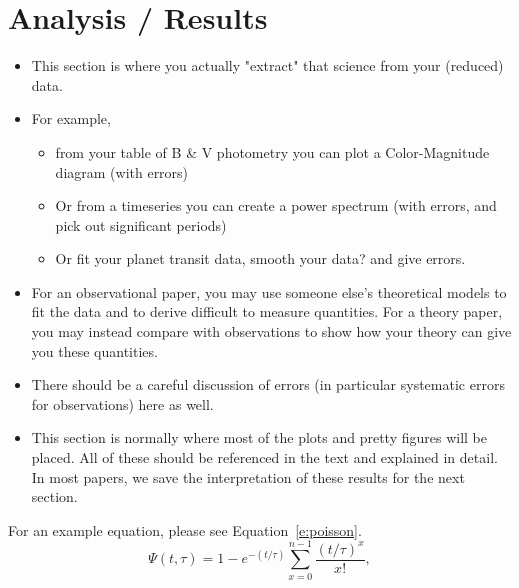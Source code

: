 \documentclass[twocolumn]{aastex61}
\begin{document}
\section{Analysis / Results}
\begin{itemize}\itemsep0em
\item This section is where you actually "extract" that science from your (reduced) data.
\item For example, 
\begin{itemize}\itemsep0em
\item from your table of B \& V photometry you can plot a Color-Magnitude diagram (with errors)
\item Or from a timeseries you can create a power spectrum (with errors, and pick out significant periods)
\item Or fit your planet transit data, smooth your data? and give errors.
\end{itemize}
\item For an observational paper, you may use someone else's theoretical models to fit the data and to derive difficult to measure quantities.  For a theory paper, you may instead compare with observations to show how your theory can give you these quantities. 
\item There should be a careful discussion of errors (in particular systematic errors for observations) here as well.
\item This section is normally where most of the plots and pretty figures will be placed.  All of these should be referenced in the text and explained in detail.  In most papers, we save the interpretation of these results for the next section.
\end{itemize}

For an example equation, please see Equation~\ref{e:poisson}.
\begin{equation} \label{e:poisson}
\Psi(t,\tau) = 1 - e^{-\left(t/\tau\right)}\sum_{x=0}^{n-1} \frac{\left(t/\tau\right)^x}{x!} ,
\end{equation}
\end{document}
